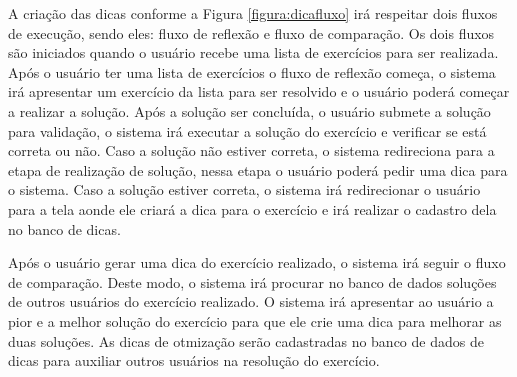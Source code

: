 A criação das dicas conforme a Figura \ref{figura:dicafluxo} irá respeitar dois fluxos de execução, sendo eles: fluxo de reflexão e fluxo de comparação. Os dois fluxos são iniciados quando o usuário recebe uma lista de exercícios para ser realizada. Após o usuário ter uma lista de exercícios o fluxo de reflexão começa, o sistema irá apresentar um exercício da lista para ser resolvido e o usuário poderá começar a realizar a solução. Após a solução ser concluída, o usuário submete a solução para validação, o sistema irá executar a solução do exercício e verificar se está correta ou não. Caso a solução não estiver correta, o sistema redireciona para a etapa de realização de solução, nessa etapa o usuário poderá pedir uma dica para o sistema. Caso a solução estiver correta, o sistema irá redirecionar o usuário para a tela aonde ele criará a dica para o exercício e irá realizar o cadastro dela no banco de dicas.

Após o usuário gerar uma dica do exercício realizado, o sistema irá seguir o fluxo de comparação. Deste modo, o sistema irá procurar no banco de dados soluções de outros usuários do exercício realizado. O sistema irá apresentar ao usuário a pior e a melhor solução do exercício para que ele crie uma dica para melhorar as duas soluções. As dicas de otmização serão cadastradas no banco de dados de dicas para auxiliar outros usuários na resolução do exercício.





